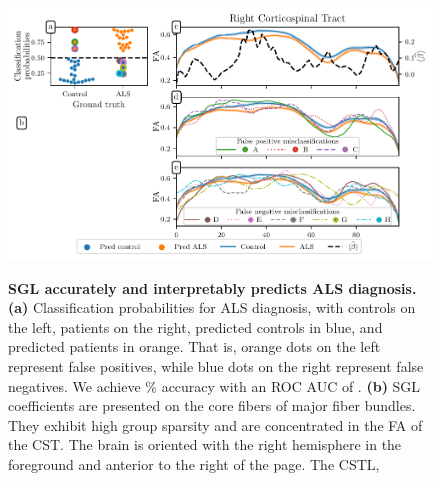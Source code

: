 \documentclass[10pt,letterpaper]{article}
\begin{document}
\begin{figure}
    \vspace{0.0cm}
    \vspace{-7.0cm}
    \includegraphics[width=\textwidth]{als_results.pdf}
    {\label{fig:class-results:probs}}
    {\label{fig:class-results:coefs3d}}
    {\label{fig:class-results:tract-profiles}}
    {\label{fig:class-results:false-positives}}
    {\label{fig:class-results:false-negatives}}
    \caption{%
        {\bf SGL accurately and interpretably predicts ALS diagnosis.}
        \label{fig:class-results}
        {\bf (a)} Classification probabilities for ALS diagnosis, with
        controls on the left, patients on the right, predicted controls in
        blue, and predicted patients in orange. That is, orange dots on the left
        represent false positives, while blue dots on the right represent
        false negatives. We achieve {\protect\alsAccuracy}\% accuracy with an
        ROC AUC of {\protect\alsRocAuc}.
        {\bf (b)} SGL coefficients are presented on the core fibers of major
        fiber bundles. They exhibit high group sparsity and are concentrated
        in the FA of the CST. The brain is oriented with the right hemisphere
        in the foreground and anterior to the right of the page. The CSTL,
}
\end{figure}
\end{document}
